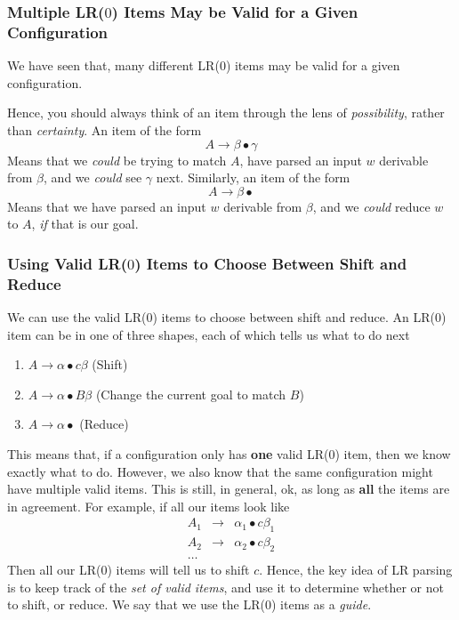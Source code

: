 \subsubsection{Multiple LR($0$) Items May be Valid for a Given Configuration}
We have seen that, many different LR($0$) items may be valid for a given configuration.

Hence, you should always think of an item through the lens of \textit{possibility}, rather than \textit{certainty}. An item of the form
\[ A \to \beta \bullet \gamma \]
Means that we \textit{could} be trying to match $A$, have parsed an input $w$ derivable from $\beta$, and we \textit{could} see $\gamma$ next. Similarly, an item of the form
\[ A \to \beta \bullet \]
Means that we have parsed an input $w$ derivable from $\beta$, and we \textit{could} reduce $w$ to $A$, \textit{if} that is our goal.

\subsubsection{Using Valid LR($0$) Items to Choose Between Shift and Reduce}
We can use the valid LR($0$) items to choose between shift and reduce. An LR($0$) item can be in one of three shapes, each of which tells us what to do next

\begin{enumerate}
    \item $A \rightarrow \alpha \bullet c \beta$ (Shift)
    \item $A \rightarrow \alpha \bullet B \beta$ (Change the current goal to match $B$)
    \item $A \rightarrow \alpha \bullet$ (Reduce)
\end{enumerate}

This means that, if a configuration only has \textbf{one} valid LR($0$) item, then we know exactly what to do. However, we also know that the same configuration might have multiple valid items. This is still, in general, ok, as long as \textbf{all} the items are in agreement. For example, if all our items look like
\[
\begin{array}{rcl}
     A_1&\to&\alpha_1 \bullet c \beta_1  \\
     A_2&\to&\alpha_2 \bullet c \beta_2  \\
     \ldots&&
\end{array}
\]
Then all our LR(0) items will tell us to shift $c$. Hence, the key idea of LR parsing is to keep track of the \textit{set of valid items}, and use it to determine whether or not to shift, or reduce. We say that we use the LR($0$) items as a \textit{guide}.

